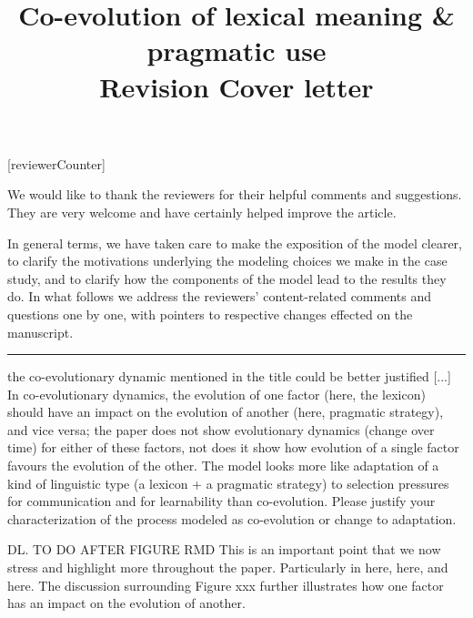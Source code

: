 \documentclass[12pt,a4paper]{article}
\newcommand{\hl}[1]{\textcolor[rgb]{.8,.33,.0}{#1}}%
\begin{document}
[reviewerCounter]
	\date{}

\title{\Large Co-evolution of lexical meaning \& pragmatic use\\ {\bf Revision Cover letter}}

	\maketitle
\normalsize

We would like to thank the reviewers for their helpful comments and suggestions. They are very welcome and have certainly helped improve the article. 

In general terms, we have taken care to make the exposition of the model clearer, to clarify the  motivations underlying the modeling choices we make in the case study, and to clarify how the components of the model lead to the results they do. In what follows we address the reviewers' content-related comments and questions one by one, with pointers to respective changes effected on the manuscript. 


\vspace{1cm}

%

\noindent\rule{\textwidth}{1pt}

\begin{mdframed}[backgroundcolor=gray!25,linecolor=gray!25,frametitle= Reviewer \thereviewerCounter~comment \thereviewerCommentCounter \hfill ~~({\it co-evolution})]
the co-evolutionary dynamic mentioned in the title could be better justified [...] In co-evolutionary dynamics, the evolution of one factor (here, the lexicon) should have an impact on the evolution of another (here, pragmatic strategy), and vice versa; the paper does not show evolutionary dynamics (change over time) for either of these factors, not does it show how evolution of a single factor favours the evolution of the other. The model looks more like adaptation of a kind of linguistic type (a lexicon + a pragmatic strategy) to selection pressures for communication and for learnability than co-evolution.  Please justify your characterization of the process modeled as co-evolution or change to adaptation.

\end{mdframed}

\hl{DL. TO DO AFTER FIGURE RMD} This is an important point that we now stress and highlight more throughout the paper. Particularly in \hl{here, here, and here}. The discussion surrounding Figure \hl{xxx} further illustrates how one factor has an impact on the evolution of another. 
\end{document}
